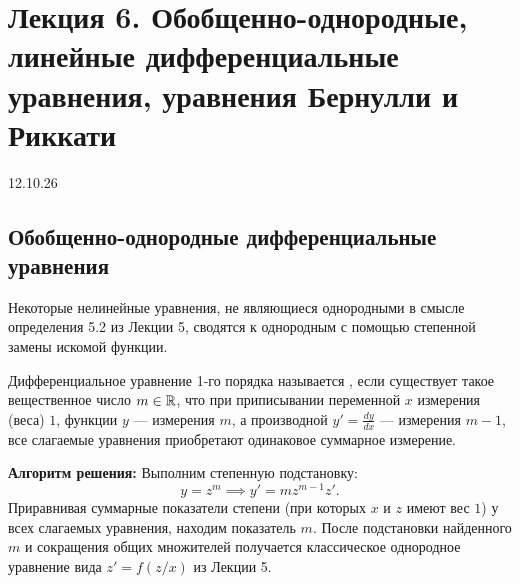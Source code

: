 \section{Лекция 6. Обобщенно-однородные, линейные дифференциальные уравнения, уравнения Бернулли и Риккати}

\begin{flushright}
    12.10.26
\end{flushright}

\subsection{Обобщенно-однородные дифференциальные уравнения}

Некоторые нелинейные уравнения, не являющиеся однородными в смысле
определения 5.2 из Лекции 5, сводятся к однородным с помощью степенной замены
искомой функции.

\begin{definition}
    Дифференциальное уравнение 1-го порядка называется
    , если существует такое вещественное число
    $m \in \mathbb{R}$, что при приписывании переменной $x$ измерения (веса) $1$,
    функции $y$ — измерения $m$, а производной $y' = \frac{dy}{dx}$ —
    измерения $m - 1$, все слагаемые уравнения приобретают одинаковое суммарное
    измерение.
\end{definition}

\textbf{Алгоритм решения:}
Выполним степенную подстановку:
\begin{equation} \label{eq:l6_gen_hom_sub}
    y = z^m \implies y' = m z^{m-1} z'. \tag{1}
\end{equation}
Приравнивая суммарные показатели степени (при которых $x$ и $z$ имеют вес $1$)
у всех слагаемых уравнения, находим показатель $m$. После подстановки
найденного $m$ и сокращения общих множителей получается классическое однородное
уравнение вида $z' = f(z/x)$ из Лекции 5.

